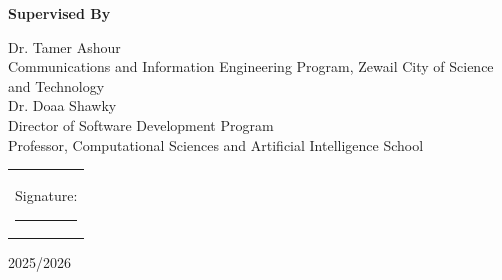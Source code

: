 \begin{singlespace}
\begin{center}
{\large\bfseries Supervised By}

\vspace{0.3cm}

Dr. Tamer Ashour\\
{\small Communications and Information Engineering Program, Zewail City of Science and Technology}\\[8pt]
Dr. Doaa Shawky\\
{\small Director of Software Development Program\\ Professor, Computational Sciences and Artificial Intelligence School}

\vspace{0.9cm}

\begin{tabular}{l}
Signature: \rule{5cm}{0.4pt} \\
\end{tabular}

\vspace{0.6cm}

{\large 2025/2026}

\end{center}
\end{singlespace}

\clearpage

